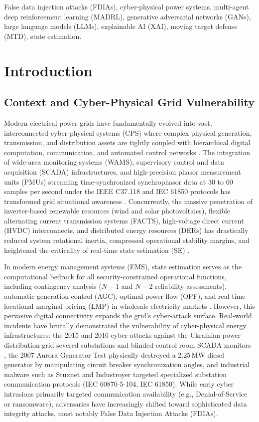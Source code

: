 \documentclass[journal,compsoc]{IEEEtran}
\begin{document}
\begin{IEEEkeywords}
False data injection attacks (FDIAs), cyber-physical power systems, multi-agent deep reinforcement learning (MADRL), generative adversarial networks (GANs), large language models (LLMs), explainable AI (XAI), moving target defense (MTD), state estimation.
\end{IEEEkeywords}


\section{Introduction}
\label{sec:intro}

\subsection{Context and Cyber-Physical Grid Vulnerability}
Modern electrical power grids have fundamentally evolved into vast, interconnected cyber-physical systems (CPS) where complex physical generation, transmission, and distribution assets are tightly coupled with hierarchical digital computation, communication, and automated control networks \cite{ref1, ref2}. The integration of wide-area monitoring systems (WAMS), supervisory control and data acquisition (SCADA) infrastructures, and high-precision phasor measurement units (PMUs) streaming time-synchronized synchrophasor data at 30 to 60 samples per second under the IEEE C37.118 and IEC 61850 protocols has transformed grid situational awareness \cite{ref3, ref4, ref9, ref23, ref60}. Concurrently, the massive penetration of inverter-based renewable resources (wind and solar photovoltaics), flexible alternating current transmission systems (FACTS), high-voltage direct current (HVDC) interconnects, and distributed energy resources (DERs) has drastically reduced system rotational inertia, compressed operational stability margins, and heightened the criticality of real-time state estimation (SE) \cite{ref12, ref13}.

In modern energy management systems (EMS), state estimation serves as the computational bedrock for all security-constrained operational functions, including contingency analysis ($N-1$ and $N-2$ reliability assessments), automatic generation control (AGC), optimal power flow (OPF), and real-time locational marginal pricing (LMP) in wholesale electricity markets \cite{ref19, ref29}. However, this pervasive digital connectivity expands the grid's cyber-attack surface. Real-world incidents have brutally demonstrated the vulnerability of cyber-physical energy infrastructures: the 2015 and 2016 cyber-attacks against the Ukrainian power distribution grid severed substations and blinded control room SCADA monitors \cite{ref5, ref6, ref8, ref24}, the 2007 Aurora Generator Test physically destroyed a 2.25\,MW diesel generator by manipulating circuit breaker synchronization angles, and industrial malware such as Stuxnet and Industroyer targeted specialized substation communication protocols (IEC 60870-5-104, IEC 61850). While early cyber intrusions primarily targeted communication availability (e.g., Denial-of-Service or ransomware), adversaries have increasingly shifted toward sophisticated data integrity attacks, most notably False Data Injection Attacks (FDIAs).
\end{document}
